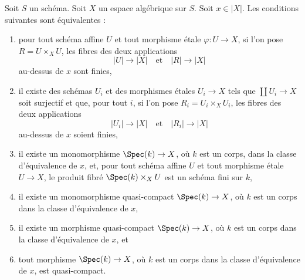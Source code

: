 \begin{lemma}
\label{lemma-UR-finite-above-x}
Soit $S$ un schéma. Soit $X$ un espace algébrique sur $S$.
Soit $x \in |X|$. Les conditions suivantes sont équivalentes :
\begin{enumerate}
\item pour tout schéma affine $U$ et tout morphisme étale
$\varphi : U \to X$, si l'on pose $R = U \times_X U$, les fibres des deux
applications
$$
|U| \longrightarrow |X|
\quad\text{et}\quad
|R| \longrightarrow |X|
$$
au-dessus de $x$ sont finies,
\item il existe des schémas $U_i$ et des morphismes étales
$U_i \to X$ tels que $\coprod U_i \to X$ soit surjectif et que, pour tout
$i$, si l'on pose $R_i = U_i \times_X U_i$, les fibres des deux applications
$$
|U_i| \longrightarrow |X|
\quad\text{et}\quad
|R_i| \longrightarrow |X|
$$
au-dessus de $x$ soient finies,
\item il existe un monomorphisme $\Spec(k) \to X$, où $k$ est un corps,
dans la classe d'équivalence de $x$, et, pour tout schéma affine $U$ et tout
morphisme étale $U \to X$, le produit fibré $\Spec(k) \times_X U$ est
un schéma fini sur $k$,
\item il existe un monomorphisme quasi-compact $\Spec(k) \to X$,
où $k$ est un corps dans la classe d'équivalence de $x$,
\item il existe un morphisme quasi-compact $\Spec(k) \to X$,
où $k$ est un corps dans la classe d'équivalence de $x$, et
\item tout morphisme $\Spec(k) \to X$, où $k$ est un corps dans la
classe d'équivalence de $x$, est quasi-compact.
\end{enumerate}
\end{lemma}


